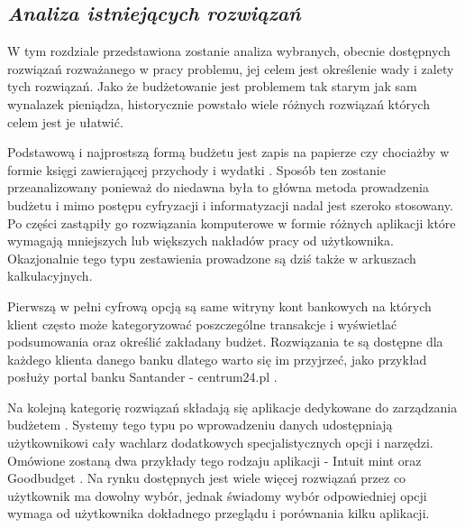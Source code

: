 \documentclass[a4paper, 10pt, twoside, openright]{report}
\newcommand{\customstylechapter}[1]{\large{\textit{#1}}}
\begin{document}
\begin{large}
\chapter{\customstylechapter{Analiza istniejących rozwiązań}}
{W tym rozdziale przedstawiona zostanie analiza wybranych, obecnie dostępnych
rozwiązań rozważanego w pracy problemu, jej celem jest określenie wady i zalety 
tych rozwiązań. Jako że budżetowanie jest problemem tak starym jak sam wynalazek
 pieniądza, historycznie powstało wiele różnych rozwiązań których celem jest je 
ułatwić.}

{Podstawową i najprostszą formą budżetu jest zapis na papierze czy chociażby w 
formie księgi zawierającej przychody i wydatki \cite{o24_budzetowanie}. Sposób ten zostanie 
przeanalizowany ponieważ do niedawna była to główna metoda prowadzenia budżetu 
i mimo postępu cyfryzacji i informatyzacji nadal jest szeroko stosowany. Po 
części zastąpiły go rozwiązania komputerowe w formie różnych aplikacji które 
wymagają mniejszych lub większych nakładów pracy od użytkownika. Okazjonalnie 
tego typu zestawienia prowadzone są dziś także w arkuszach kalkulacyjnych.}

{Pierwszą w pełni cyfrową opcją są same witryny kont bankowych \cite{ingbudżet} 
na których klient często może kategoryzować poszczególne transakcje i wyświetlać
 podsumowania oraz określić zakładany budżet. Rozwiązania te są dostępne dla 
każdego klienta danego banku dlatego warto się im przyjrzeć, jako przykład 
posłuży portal banku Santander - centrum24.pl \cite{santandercentrum24}.}

{Na kolejną kategorię rozwiązań składają się aplikacje dedykowane do zarządzania
 budżetem \cite{budget}. Systemy tego typu po wprowadzeniu danych udostępniają 
użytkownikowi cały wachlarz dodatkowych specjalistycznych opcji i narzędzi. 
Omówione zostaną dwa przykłady tego rodzaju aplikacji - Intuit mint \cite{mint} 
oraz Goodbudget \cite{goodbudget}. Na rynku dostępnych jest wiele więcej 
rozwiązań przez co użytkownik ma dowolny wybór, jednak świadomy wybór 
odpowiedniej opcji wymaga od użytkownika dokładnego przeglądu i porównania kilku
 aplikacji.}


\end{large}
\end{document}
